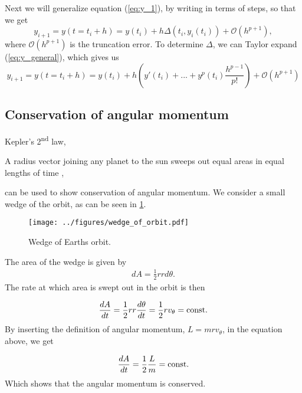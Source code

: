 \documentclass[../main.tex]{subfiles}
\begin{document}
Next we will generalize equation (\ref{eq:y_1}), by writing in terms of steps, so that we get
\begin{equation}\label{eq:y_general}
    y_{i + 1} = y(t= t_i + h) = y(t_i) + h \Delta (t_i , y_i (t_i)) + \mathcal{O}(h^{p + 1}), 
\end{equation}
where $\mathcal{O}(h^{p + 1})$ is the truncation error. To determine $\Delta$, we can Taylor expand (\ref{eq:y_general}), which gives us 
\begin{equation}
    y_{i + 1} = y(t= t_i + h) = y(t_i) + h \left( y'(t_i) + ... + y^{p}(t_i) \frac{h^{p - 1}}{p!} \right) + \mathcal{O}(h^{p + 1})
    \label{eq:y-taylor}
\end{equation}

\subsection{Conservation of angular momentum}
Kepler's 2\textsuperscript{nd} law, 

\begin{displayquote}
A radius vector joining any planet to the sun sweeps out equal areas in equal lengths of time \cite{Kepler2nd}, 
\end{displayquote} can be used to show conservation of angular momentum. We consider a small wedge of the orbit, as can be seen in \cref{fig:wedge}.

\begin{figure}[htb!]
    \centering
    \texttt{[image: ../figures/wedge\_of\_orbit.pdf]}
    \caption{Wedge of Earths orbit.}
    \label{fig:wedge}
\end{figure}

The area of the wedge is given by
\begin{align*}
    dA = \frac{1}{2}rrd\theta.
\end{align*} The rate at which area is swept out in the orbit is then 

\begin{align*}
    \frac{dA}{dt}=\frac{1}{2}rr\frac{d\theta}{dt}=\frac{1}{2}rv_{\theta}=\textnormal{const.}
\end{align*} By inserting the definition of angular momentum, \ensuremath{L=mrv_{\theta}}, in the equation above, we get

\begin{align*}
    \frac{dA}{dt}=\frac{1}{2}\frac{L}{m}=\textnormal{const.}
\end{align*} Which shows that the angular momentum is conserved. 
\end{document}
